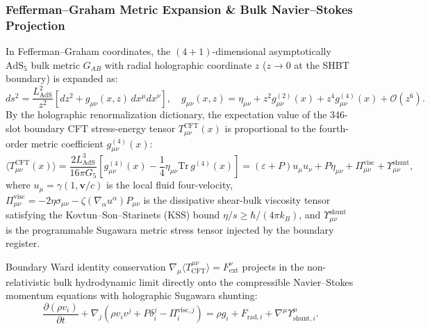 \documentclass[11pt,onecolumn]{article}
\begin{document}
\subsubsection{Fefferman--Graham Metric Expansion \& Bulk Navier--Stokes Projection}
In Fefferman--Graham coordinates, the $(4+1)$-dimensional asymptotically $\mathrm{AdS}_5$ bulk metric $G_{AB}$ with radial holographic coordinate $z$ ($z \to 0$ at the SHBT boundary) is expanded as:
\begin{equation}
ds^2 = \frac{L_{\mathrm{AdS}}^2}{z^2}\left[ dz^2 + g_{\mu\nu}(x, z)\,dx^\mu dx^\nu \right], \quad g_{\mu\nu}(x, z) = \eta_{\mu\nu} + z^2 g_{\mu\nu}^{(2)}(x) + z^4 g_{\mu\nu}^{(4)}(x) + \mathcal{O}(z^6).
\end{equation}
By the holographic renormalization dictionary, the expectation value of the 346-slot boundary CFT stress-energy tensor $T_{\mu\nu}^{\mathrm{CFT}}(x)$ is proportional to the fourth-order metric coefficient $g_{\mu\nu}^{(4)}(x)$:
\begin{equation}
\langle T_{\mu\nu}^{\mathrm{CFT}}(x) \rangle = \frac{2 L_{\mathrm{AdS}}^3}{16\pi G_5} \left[ g_{\mu\nu}^{(4)}(x) - \frac{1}{4}\eta_{\mu\nu}\mathrm{Tr}\,g^{(4)}(x) \right] = (\varepsilon + P)u_\mu u_\nu + P\eta_{\mu\nu} + \Pi_{\mu\nu}^{\mathrm{visc}} + \Upsilon_{\mu\nu}^{\mathrm{shunt}},
\end{equation}
where $u_\mu = \gamma(1, \mathbf{v}/c)$ is the local fluid four-velocity, $\Pi_{\mu\nu}^{\mathrm{visc}} = -2\eta\sigma_{\mu\nu} - \zeta(\nabla_\alpha u^\alpha)P_{\mu\nu}$ is the dissipative shear-bulk viscosity tensor satisfying the Kovtun--Son--Starinets (KSS) bound $\eta/s \ge \hbar/(4\pi k_B)$, and $\Upsilon_{\mu\nu}^{\mathrm{shunt}}$ is the programmable Sugawara metric stress tensor injected by the boundary register.

Boundary Ward identity conservation $\nabla_\mu \langle T^{\mu\nu}_{\mathrm{CFT}} \rangle = F^\nu_{\mathrm{ext}}$ projects in the non-relativistic bulk hydrodynamic limit directly onto the compressible Navier--Stokes momentum equations with holographic Sugawara shunting:
\begin{equation}
\frac{\partial (\rho v_i)}{\partial t} + \nabla_j \left(\rho v_i v^j + P\delta_i^j - \Pi_i^{\mathrm{visc},j}\right) = \rho g_i + F_{\mathrm{rad},i} + \nabla^\mu \Upsilon^\mu_{\mathrm{shunt},i}.
\label{eq:ns_holographic}
\end{equation}
\end{document}
